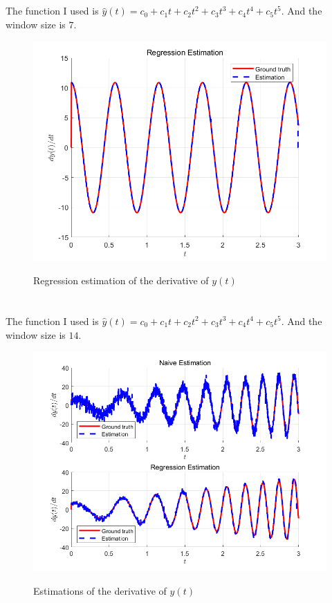 \documentclass{article}
\theoremstyle{definition} %
\begin{document}
\subsection{}
The function I used is $\hat{y}(t) = c_0 + c_1 t + c_2 t^2 + c_3 t^3 + c_4 t^4 + c_5 t^5$. And the window size is $7$.
\begin{figure}[H]
    \centering
        \textsf{\includegraphics[width=0.6\columnwidth]{hw6-prob2-fig2.png}}
        \caption{Regression estimation of the derivative of $y(t)$}
        \label{fig: 2-2}
\end{figure}


\section{}

\subsection{}

The function I used is $\hat{y}(t) = c_0 + c_1 t + c_2 t^2 + c_3 t^3 + c_4 t^4 + c_5 t^5$. And the window size is $14$.

\begin{figure}[H]
    \centering
        \textsf{\includegraphics[width=0.6\columnwidth]{hw6-prob3-fig1.png}}
        \caption{Estimations of the derivative of $y(t)$}
        \label{fig: 3-1}
\end{figure}
\end{document}
